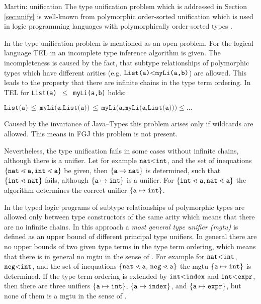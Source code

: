 Martin: unification
The type unification problem which is addressed in Section \ref{sec:unify} is
well-known from polymorphic order-sorted unification which is used in logic
programming languages with polymorphically order-sorted types
\cite{GS89,MH91,HiTo92,CB95}.

In \cite{GS89} the type unification problem
is mentioned as an open problem. For the logical language \textsf{TEL} in
\cite{GS89} an incomplete type inference algorithm is given. The incompleteness
is caused by the fact, that subtype relationships
of polymorphic types which have different arities  (e.g. $\texttt{List(a)} \mbox{$<$}
\texttt{myLi(a,b)}$) are allowed. This leads to the property that there are
infinite chains in the type term ordering. In \textsf{TEL} for \texttt{List(a)}
$\,\leq\,$ \texttt{myLi(a,b)} holds: 

\smallskip
{\centering $\texttt{List(a)} \,\leq\, \texttt{myLi(a,List(a))} \,\leq\,
\texttt{myLi(a,myLi(a,List(a)))}  \leq \ldots$\\}

Caused by the invariance of Java--Types this problem arises only if wildcards
are allowed. This means in FGJ this problem is not present.

\medskip
Nevertheless, the type unification 
fails in some cases without infinite chains, although there is a unifier. Let
for example $\texttt{nat} 
\mbox{$<$} \texttt{int}$, and the set of inequations $\{ \mathtt{nat} \lessdot \mathtt{a}, \mathtt{int}
  \lessdot \mathtt{a} \}$ be given, then $\{ \mathtt{a} \mapsto \mathtt{nat} \}$
is determined, such that 
$\{ \mathtt{int} \lessdot \mathtt{nat} \}$ fails, although $\{ \mathtt{a}\mapsto \mathtt{int} \}$ is
a unifier. For $\{ \mathtt{int} \lessdot \mathtt{a}, \mathtt{nat} \lessdot
  \mathtt{a} \}$ the algorithm determines the correct unifier
$\{ \mathtt{a}\mapsto \mathtt{int} \}$.

In the typed logic programs of \cite{HiTo92} subtype
relationships of polymorphic types are allowed only between type
constructors of the same arity which means that there are no infinite chains.
In this approach a \emph{most general type unifier (mgtu)} is
defined as an upper bound of different principal type unifiers. In general
there are no upper bounds of two given type terms in the type term ordering,
which means that there is in general no mgtu in the sense of \cite{HiTo92}.
For example for  $\texttt{nat} \mbox{$<$} \texttt{int}$, $\texttt{neg} 
\mbox{$<$} \texttt{int}$, and the set of inequations $\set{\mathtt{nat} \lessdot
  \mathtt{a}$, $\mathtt{neg} \lessdot \mathtt{a}}$ the mgtu $\{ \mathtt{a} \mapsto \texttt{int} \}$ is
determined. If the type term ordering is extended by $\mathtt{int} \mbox{$<$}
\mathtt{index}$ and $\mathtt{int} \mbox{$<$} \mathtt{expr}$, then there are three
unifiers $\{ \mathtt{a} \mapsto \texttt{int} \}$, $\{ \mathtt{a} \mapsto
  \mathtt{index} \}$, and $\{ \mathtt{a} \mapsto 
\mathtt{expr} \}$, but none of them is a mgtu in the sense of \cite{HiTo92}.

